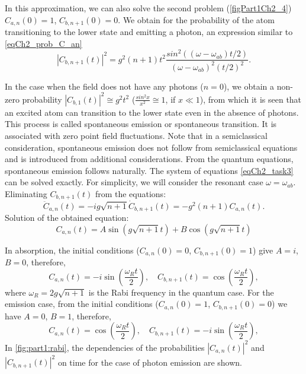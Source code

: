 

In this approximation, we can also solve the second problem (\autoref{figPart1Ch2_4}) 
$C_{a, n}\left(0\right) = 1$, $C_{b, n + 1}\left(0\right) = 0$. 
We obtain for the probability of the atom transitioning to the lower state and emitting a photon, an expression similar to \eqref{eqCh2_prob_C_an}  
\begin{equation}
\left|C_{b, n + 1}\left(t\right)\right|^2 = g^2 \left(n + 1\right) t^2
\frac{sin^2\left(\left(\omega - \omega_{ab}\right)t/2\right)}
{\left(\omega - \omega_{ab}\right)^2\left(t/2\right)^2}.
\label{eqCh2_prob_C_bn}
\end{equation}

In the case when the field does not have any photons ($n = 0$),
we obtain a non-zero probability 
$\left|C_{b, 1}\left(t\right)\right|^2 \cong g^2 t^2$
($\frac{sin^2 x}{x^2} \cong 1$, if
$x \ll 1$), from which it is seen that an excited atom can transition to the lower state even in the absence of photons. This process is called spontaneous emission or spontaneous transition. It is associated with zero point field fluctuations. Note that in a semiclassical consideration, spontaneous emission does not follow from semiclassical equations and is introduced from additional considerations. From the quantum equations, spontaneous emission follows naturally. 
The system of equations \eqref{eqCh2_task3} can be solved exactly. For simplicity,
we will consider the resonant case $\omega = \omega_{ab}$.
Eliminating $C_{b, n + 1}\left(t\right)$ from the equations:   
\[
{\ddot C}_{a,n}\left(t\right) = -i g \sqrt{n + 1}
{\dot C}_{b, n + 1}\left(t\right) = -g^2 \left(n + 1\right)
C_{a,n}\left(t\right). 
\]
Solution of the obtained equation:
\begin{equation}
C_{a,n}\left(t\right) = A \sin\left(g \sqrt{n + 1} t\right) +
B \cos\left(g \sqrt{n + 1} t\right)
\nonumber
\end{equation}

In absorption, the initial conditions ($C_{a,n}\left(0\right) = 0$, $C_{b,n+1}\left(0\right)
= 1$) give $A = i$, $B = 0$, therefore,  
\begin{equation}
C_{a,n}\left(t\right) = -i \sin\left(\frac{\omega_R t}{2}\right), \quad
C_{b, n + 1}\left(t\right) = \cos\left(\frac{\omega_R t}{2}\right),
\label{eqPart1RabiAbsorbtion}
\end{equation}
where $\omega_R = 2g\sqrt{n + 1}$ is the Rabi frequency in the quantum case. For the emission case, from the initial conditions ($C_{a,n}\left(0\right) = 1$,
$C_{b,n+1}\left(0\right) = 0$) we have $A = 0$, $B = 1$, therefore, 
\begin{equation}
C_{a,n}\left(t\right) = \cos\left(\frac{\omega_R t}{2}\right), \quad
C_{b, n + 1}\left(t\right) = -i \sin\left(\frac{\omega_R t}{2}\right),
\label{eqPart1RabiEmission}
\end{equation}
In \autoref{fig:part1:rabi}, the dependencies of the probabilities 
$\left|C_{a,n}\left(t\right)\right|^2$ and 
$\left|C_{b, n + 1}\left(t\right)\right|^2$ on time for the case
of photon emission are shown.

